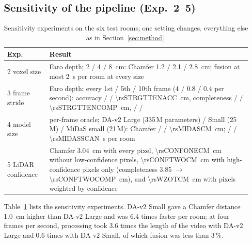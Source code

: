 \subsection{Sensitivity of the pipeline (Exp.~2--5)}\label{sec:secondary}
\begin{table}[t]
\centering\small
\caption{Sensitivity experiments on the six test rooms; one setting changes, everything else as in Section~\ref{sec:method}.}
\label{tab:secondary}
\footnotesize
\begin{tabularx}{\columnwidth}{@{}l>{\raggedright\arraybackslash}X@{}}
\toprule
Exp. & Result \\
\midrule
2 voxel size & Faro depth; 2 / 4 / \SI{8}{cm}: Chamfer 1.2 / 2.1 / \SI{2.8}{cm}; fusion at most \SI{2}{s} per room at every size \\
3 frame stride & Faro depth; every 1st / 5th / 10th frame (4 / 0.8 / 0.4 per second): accuracy \rsSTRGTONEACC{} / \rsSTRGTFIVEACC{} / \SI{\rsSTRGTTENACC}{cm},
completeness \rsSTRGTONECOMP{} / \rsSTRGTFIVECOMP{} / \SI{\rsSTRGTTENCOMP}{cm}, \fscore{} \rsSTRGTONEF{} / \rsSTRGTFIVEF{} / \rsSTRGTTENF{} \\
4 model size & per-frame oracle; DA-v2 Large (335\,M parameters) / Small (25\,M) / MiDaS small (21\,M): Chamfer
\rsDALARGECM{} / \rsDASMALLCM{} / \SI{\rsMIDASCM}{cm}; \rsDALARGESCAN{} / \rsDASMALLSCAN{} / \SI{\rsMIDASSCAN}{s} per room \\
5 LiDAR confidence & Chamfer \SI{3.04}{cm} with every pixel, \SI{\rsCONFONECM}{cm} without low-confidence pixels,
\SI{\rsCONFTWOCM}{cm} with high-confidence pixels only (completeness 3.85 $\rightarrow$ \SI{\rsCONFTWOCOMP}{cm}),
\rsWOTFCM{} and \SI{\rsWZOTCM}{cm} with pixels weighted by confidence \\
\bottomrule
\end{tabularx}
\end{table}

Table~\ref{tab:secondary} lists the sensitivity experiments. DA-v2 Small gave a Chamfer distance \SI{1.0}{cm} higher
than DA-v2 Large and was 6.4 times faster per room; at four frames per second, processing took 3.6 times the length of
the video with DA-v2 Large and 0.6 times with DA-v2 Small, of which fusion was less than 3\,\%.
